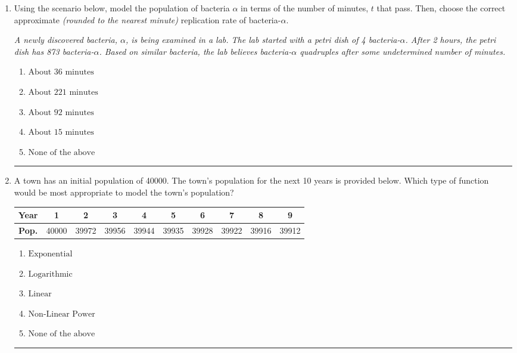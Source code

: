 \documentclass[14pt]{extbook}
\newcommand{\litem}[1]{\item#1\hspace*{-1cm}\rule{\textwidth}{0.4pt}}
\begin{document}
\begin{enumerate}
\litem{
Using the scenario below, model the population of bacteria $\alpha$ in terms of the number of minutes, $t$ that pass. Then, choose the correct approximate \textit{(rounded to the nearest minute)} replication rate of bacteria-$\alpha$.
\begin{center}
    \textit{ A newly discovered bacteria, $\alpha$, is being examined in a lab. The lab started with a petri dish of 4 bacteria-$\alpha$. After 2 hours, the petri dish has 873 bacteria-$\alpha$. Based on similar bacteria, the lab believes bacteria-$\alpha$ quadruples after some undetermined number of minutes. }
\end{center}
\begin{enumerate}[label=\Alph*.]
\item \( \text{About } 36 \text{ minutes} \)
\item \( \text{About } 221 \text{ minutes} \)
\item \( \text{About } 92 \text{ minutes} \)
\item \( \text{About } 15 \text{ minutes} \)
\item \( \text{None of the above} \)

\end{enumerate} }
\litem{
A town has an initial population of 40000. The town's population for the next 10 years is provided below. Which type of function would be most appropriate to model the town's population?


\begin{tabular}{c|c|c|c|c|c|c|c|c|c}
\textbf{Year} & 1 & 2 & 3 & 4 & 5 & 6 & 7 & 8 & 9 \tabularnewline
\hline
\textbf{Pop.} & 40000 & 39972 & 39956 & 39944 & 39935 & 39928 & 39922 & 39916 & 39912
\end{tabular} \begin{enumerate}[label=\Alph*.]
\item \( \text{Exponential} \)
\item \( \text{Logarithmic} \)
\item \( \text{Linear} \)
\item \( \text{Non-Linear Power} \)
\item \( \text{None of the above} \)


\end{enumerate}}
\end{enumerate}
\end{document}
